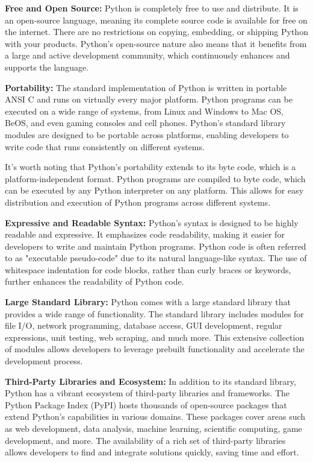\documentclass[12pt]{book}
\begin{document}
\textbf{Free and Open Source:} Python is completely free to use and distribute. It is an open-source language, meaning its complete source code is available for free on the internet. There are no restrictions on copying, embedding, or shipping Python with your products. Python's open-source nature also means that it benefits from a large and active development community, which continuously enhances and supports the language.

\textbf{Portability:} The standard implementation of Python is written in portable ANSI C and runs on virtually every major platform. Python programs can be executed on a wide range of systems, from Linux and Windows to Mac OS, BeOS, and even gaming consoles and cell phones. Python's standard library modules are designed to be portable across platforms, enabling developers to write code that runs consistently on different systems.

It's worth noting that Python's portability extends to its byte code, which is a platform-independent format. Python programs are compiled to byte code, which can be executed by any Python interpreter on any platform. This allows for easy distribution and execution of Python programs across different systems.

\textbf{Expressive and Readable Syntax:} Python's syntax is designed to be highly readable and expressive. It emphasizes code readability, making it easier for developers to write and maintain Python programs. Python code is often referred to as "executable pseudo-code" due to its natural language-like syntax. The use of whitespace indentation for code blocks, rather than curly braces or keywords, further enhances the readability of Python code.

\textbf{Large Standard Library:} Python comes with a large standard library that provides a wide range of functionality. The standard library includes modules for file I/O, network programming, database access, GUI development, regular expressions, unit testing, web scraping, and much more. This extensive collection of modules allows developers to leverage prebuilt functionality and accelerate the development process.

\textbf{Third-Party Libraries and Ecosystem:} In addition to its standard library, Python has a vibrant ecosystem of third-party libraries and frameworks. The Python Package Index (PyPI) hosts thousands of open-source packages that extend Python's capabilities in various domains. These packages cover areas such as web development, data analysis, machine learning, scientific computing, game development, and more. The availability of a rich set of third-party libraries allows developers to find and integrate solutions quickly, saving time and effort.
\end{document}
